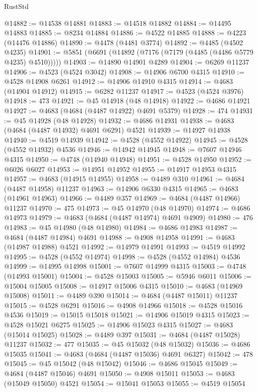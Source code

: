\begin{lexlean}{RustStd}
\begin{coremodule}
@14882 := @14538 @14881
@14883 := @14518 @14882
@14884 := @14495 @14883
@14885 := @8234 @14884
@14886 := @4522 @14885
@14888 := @4223 (@14476 @14886)
@14890 := @4478 (@4481 @3774)
@14892 := @4485 (@4502 @4235)
@14901 := @5851 (@6691 (@14892 (@7176 (@7179 (@4485 (@4486 @5779 @4235) @4510)))))
@14903 := @14890 @14901 @4289
@14904 := @6269 @11237
@14906 := @4523 (@4524 @3042)
@14908 := @14906 @6700 @4315
@14910 := @4528 @14908 @6261
@14912 := @14906 @14910 @4315
@14914 := @4683 (@14904 @14912)
@14915 := @6282 @11237
@14917 := @4523 (@4524 @3976)
@14918 := 473
@14921 := @45 @14918 (@48 @14918)
@14922 := @4686 @14921
@14927 := @4683 (@4684 (@4487 @14922) @4691 @5379)
@14928 := 474
@14931 := @45 @14928 (@48 @14928)
@14932 := @4686 @14931
@14938 := @4683 (@4684 (@4487 @14932) @4691 @6291) @4521
@14939 := @14927 @14938
@14940 := @4519 @14939
@14942 := @4528 (@4552 @14922)
@14945 := @4528 (@4552 @14932) @4536
@14946 := @14942 @14945
@14948 := @7607 @14946 @4315
@14950 := @4748 (@14940 @14948)
@14951 := @4528 @14950
@14952 := @6026 @6027
@14953 := @14951 @14952
@14955 := @14917 @14953 @4315
@14957 := @4683 (@14915 @14955)
@14958 := @4489 @310
@14961 := @4684 (@4487 @14958) @11237
@14963 := @14906 @6330 @4315
@14965 := @4683 (@14961 @14963)
@14966 := @4489 @357
@14969 := @4684 (@4487 @14966) @11237
@14970 := 475
@14973 := @45 @14970 (@48 @14970)
@14974 := @4686 @14973
@14979 := @4683 (@4684 (@4487 @14974) @4691 @4909)
@14980 := 476
@14983 := @45 @14980 (@48 @14980)
@14984 := @4686 @14983
@14987 := @4684 (@4487 @14984) @4691
@14988 := @4908 @14958
@14991 := @4683 (@14987 @14988) @4521
@14992 := @14979 @14991
@14993 := @4519 @14992
@14995 := @4528 (@4552 @14974)
@14998 := @4528 (@4552 @14984) @4536
@14999 := @14995 @14998
@15001 := @7607 @14999 @4315
@15003 := @4748 (@14993 @15001)
@15004 := @4528 @15003
@15005 := @5946 @6011
@15006 := @15004 @15005
@15008 := @14917 @15006 @4315
@15010 := @4683 (@14969 @15008)
@15011 := @4489 @390
@15014 := @4684 (@4487 @15011) @11237
@15015 := @4528 @6291
@15016 := @4908 @14966
@15018 := @4528 @15016 @4536
@15019 := @15015 @15018
@15021 := @14906 @15019 @4315
@15023 := @4528 @15021 @6275
@15025 := @14906 @15023 @4315
@15027 := @4683 (@15014 @15025)
@15028 := @4489 @397
@15031 := @4684 (@4487 @15028) @11237
@15032 := 477
@15035 := @45 @15032 (@48 @15032)
@15036 := @4686 @15035
@15041 := @4683 (@4684 (@4487 @15036) @4691 @6327)
@15042 := 478
@15045 := @45 @15042 (@48 @15042)
@15046 := @4686 @15045
@15049 := @4684 (@4487 @15046) @4691
@15050 := @4908 @15011
@15053 := @4683 (@15049 @15050) @4521
@15054 := @15041 @15053
@15055 := @4519 @15054

\end{coremodule}
\end{lexlean}

